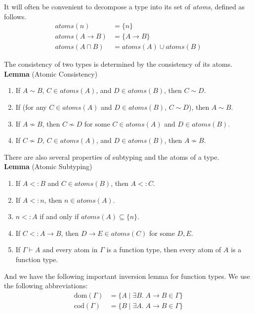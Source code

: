 \documentclass{article}
\newcommand{\ATOMS}[1]{\mathit{atoms}(#1)}
\begin{document}
It will often be convenient to decompose a type into its set of
\emph{atoms}, defined as follows.
\begin{align*}
  \ATOMS{n} &= \{ n \} \\
  \ATOMS{A\to B} &= \{ A \to B \} \\
  \ATOMS{A \sqcap B} &= \ATOMS{A} \cup \ATOMS{B}
\end{align*}

The consistency of two types is determined by the consistency of its
atoms. \\

\noindent \textbf{Lemma} (Atomic Consistency) 
\begin{enumerate}
\item If $A \sim B$, $C \in \ATOMS{A}$, and $D \in \ATOMS{B}$,
  then $C \sim D$.
\item If (for any $C \in \ATOMS{A}$ and $D \in \ATOMS{B}$, 
  $C \sim D$), then $A \sim B$.
\item If $A \not\sim B$, then $C \not\sim D$ for some
  $C \in \ATOMS{A}$ and $D \in \ATOMS{B}$.
\item If $C \not\sim D$, $C \in \ATOMS{A}$, and $D \in \ATOMS{B}$,
  then $A \not\sim B$. 
\end{enumerate}

There are also several properties of subtyping and the atoms of a type.\\

\noindent \textbf{Lemma} (Atomic Subtyping)
\begin{enumerate}
\item If $A <: B$ and $C \in \ATOMS{B}$, then $A <: C$.
\item If $A <: n$, then $n \in \ATOMS{A}$.
\item $n <: A$ if and only if $\ATOMS{A} \subseteq \{ n \}$.
\item If $C <: A \to B$, then $D\to E \in \ATOMS{C}$ for some $D,E$.
\item If $\Gamma \vdash A$ and every atom in $\Gamma$ is a function type,
  then every atom of $A$ is a function type.
\end{enumerate}

And we have the following important inversion lemma for function
types. We use the following abbreviations:
\begin{align*}
  \mathrm{dom}(\Gamma) &= \{ A \mid \exists B.\; A \to B \in \Gamma \}\\
  \mathrm{cod}(\Gamma) &= \{ B \mid \exists A.\; A \to B \in \Gamma \}
\end{align*}
\end{document}
